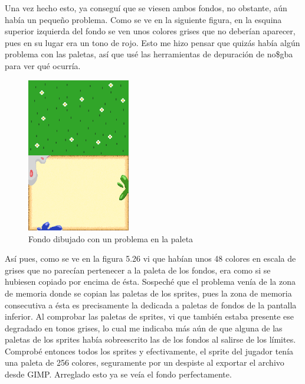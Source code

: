 \vspace{0.5cm}

Una vez hecho esto, ya conseguí que se viesen ambos fondos, no obstante, aún había un pequeño problema. Como se ve en la siguiente figura, en la esquina superior izquierda del fondo se ven unos colores grises que no deberían aparecer, pues en su lugar era un tono de rojo. Esto me hizo pensar que quizás había algún problema con las paletas, así que usé las herramientas de depuración de no\$gba para ver qué ocurría.

\clearpage

\begin{figure}[htbp]
\centering
  \includegraphics[width=0.4\textwidth]{archivos/background_gray.png}
  \caption{Fondo dibujado con un problema en la paleta}
  \label{fig:background_gray}
\end{figure}

\vspace{0.5cm}

Así pues, como se ve en la figura 5.26 vi que habían unos 48 colores en escala de grises que no parecían pertenecer a la paleta de los fondos, era como si se hubiesen copiado por encima de ésta. Sospeché que el problema venía de la zona de memoria donde se copian las paletas de los sprites, pues la zona de memoria consecutiva a ésta es precisamente la dedicada a paletas de fondos de la pantalla inferior. Al comprobar las paletas de sprites, vi que también estaba presente ese degradado en tonos grises, lo cual me indicaba más aún de que alguna de las paletas de los sprites había sobreescrito las de los fondos al salirse de los límites. Comprobé entonces todos los sprites y efectivamente, el sprite del jugador tenía una paleta de 256 colores, seguramente por un despiste al exportar el archivo desde GIMP. Arreglado esto ya se veía el fondo perfectamente.

